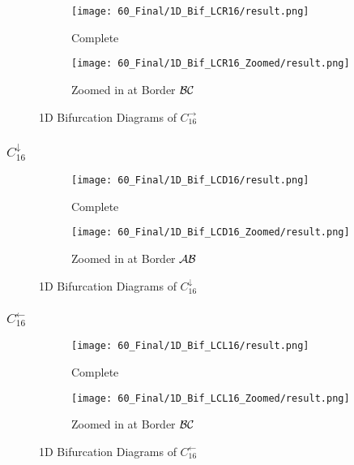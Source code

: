\begin{figure}
    \centering
    \begin{subfigure}{0.4\textwidth}
        \centering
        \texttt{[image: 60\_Final/1D\_Bif\_LCR16/result.png]}
        \caption{Complete}
        \label{fig:final.bifurcation.C.right}
    \end{subfigure}
    \begin{subfigure}{0.4\textwidth}
        \centering
        \texttt{[image: 60\_Final/1D\_Bif\_LCR16\_Zoomed/result.png]}
        \caption{Zoomed in at Border $\mathcal{B}\mathcal{C}$}
        \label{fig:final.bifurcation.C.right.zoomed}
    \end{subfigure}
    \caption{1D Bifurcation Diagrams of $C_{16}^\rightarrow$}
\end{figure}

\subsubsection{$C_{16}^\downarrow$}

\begin{figure}
    \centering
    \begin{subfigure}{0.4\textwidth}
        \centering
        \texttt{[image: 60\_Final/1D\_Bif\_LCD16/result.png]}
        \caption{Complete}
        \label{fig:final.bifurcation.C.down}
    \end{subfigure}
    \begin{subfigure}{0.4\textwidth}
        \centering
        \texttt{[image: 60\_Final/1D\_Bif\_LCD16\_Zoomed/result.png]}
        \caption{Zoomed in at Border $\mathcal{A}\mathcal{B}$}
        \label{fig:final.bifurcation.C.down.zoomed}
    \end{subfigure}
    \caption{1D Bifurcation Diagrams of $C_{16}^\downarrow$}
\end{figure}

\subsubsection{$C_{16}^\leftarrow$}

\begin{figure}
    \centering
    \begin{subfigure}{0.4\textwidth}
        \centering
        \texttt{[image: 60\_Final/1D\_Bif\_LCL16/result.png]}
        \caption{Complete}
        \label{fig:final.bifurcation.C.left}
    \end{subfigure}
    \begin{subfigure}{0.4\textwidth}
        \centering
        \texttt{[image: 60\_Final/1D\_Bif\_LCL16\_Zoomed/result.png]}
        \caption{Zoomed in at Border $\mathcal{B}\mathcal{C}$}
        \label{fig:final.bifurcation.C.left.zoomed}
    \end{subfigure}
    \caption{1D Bifurcation Diagrams of $C_{16}^\leftarrow$}
\end{figure}

